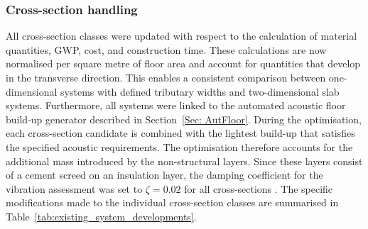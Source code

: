 \subsubsection{Cross-section handling}
All cross-section classes were updated with respect to the calculation of material quantities, GWP, cost, and construction time. These calculations are now normalised per square metre of floor area and account for quantities that develop in the transverse direction. This enables a consistent comparison between one-dimensional systems with defined tributary widths and two-dimensional slab systems. Furthermore, all systems were linked to the automated acoustic floor build-up generator described in Section~\ref{Sec: AutFloor}. During the optimisation, each cross-section candidate is combined with the lightest build-up that satisfies the specified acoustic requirements. The optimisation therefore accounts for the additional mass introduced by the non-structural layers. Since these layers consist of a cement screed on an insulation layer, the damping coefficient for the vibration assessment was set to \(\zeta = 0.02\) for all cross-sections \cite{Lignum2021_HBT1}. The specific modifications made to the individual cross-section classes are summarised in Table~\ref{tab:existing_system_developments}.

